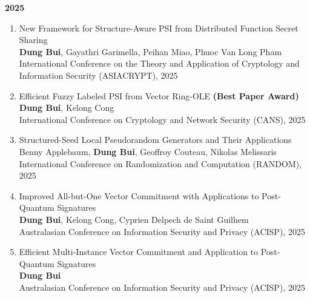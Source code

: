 \documentclass[11pt]{article}
\begin{document}
\smallskip
\textbf{2025}
\begin{enumerate}
      \item New Framework for Structure-Aware PSI from Distributed Function Secret Sharing\\
            \textbf{Dung Bui}, Gayathri Garimella, Peihan Miao, Phuoc Van Long Pham\\
            International Conference on the Theory and Application of Cryptology and Information Security (ASIACRYPT), 2025
      \item Efficient Fuzzy Labeled PSI from Vector Ring-OLE \quad\textbf{(Best Paper Award)}\\
            \textbf{Dung Bui}, Kelong Cong\\
            International Conference on Cryptology and Network Security (CANS), 2025
      \item Structured-Seed Local Pseudorandom Generators and Their Applications\\
            Benny Applebaum, \textbf{Dung Bui}, Geoffroy Couteau, Nikolas Melissaris\\
            International Conference on Randomization and Computation (RANDOM), 2025
      \item Improved All-but-One Vector Commitment with Applications to Post-Quantum Signatures\\
            \textbf{Dung Bui}, Kelong Cong, Cyprien Delpech de Saint Guilhem\\
            Australasian Conference on Information Security and Privacy (ACISP), 2025
      \item Efficient Multi-Instance Vector Commitment and Application to Post-Quantum Signatures\\
            \textbf{Dung Bui}\\
            Australasian Conference on Information Security and Privacy (ACISP), 2025
\end{enumerate}
\end{document}
